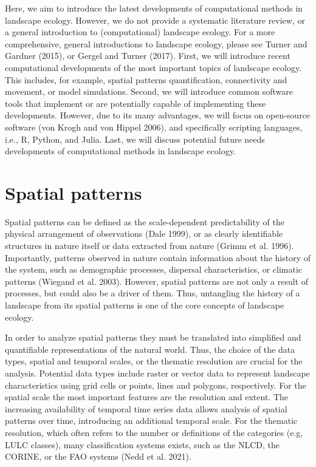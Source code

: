\documentclass[
  12pt,
  a4paperpaper,
]{article}
\begin{document}
Here, we aim to introduce the latest developments of computational
methods in landscape ecology. However, we do not provide a systematic
literature review, or a general introduction to (computational)
landscape ecology. For a more comprehensive, general introductions to
landscape ecology, please see Turner and Gardner (2015), or Gergel and
Turner (2017). First, we will introduce recent computational
developments of the most important topics of landscape ecology. This
includes, for example, spatial patterns quantification, connectivity and
movement, or model simulations. Second, we will introduce common
software tools that implement or are potentially capable of implementing
these developments. However, due to its many advantages, we will focus
on open-source software (von Krogh and von Hippel 2006), and
specifically scripting languages, i.e., R, Python, and Julia. Last, we
will discuss potential future needs developments of computational
methods in landscape ecology.

\section{Spatial patterns}\label{spatial-patterns}

Spatial patterns can be defined as the scale-dependent predictability of
the physical arrangement of observations (Dale 1999), or as clearly
identifiable structures in nature itself or data extracted from nature
(Grimm et al. 1996). Importantly, patterns observed in nature contain
information about the history of the system, such as demographic
processes, dispersal characteristics, or climatic patterns (Wiegand et
al. 2003). However, spatial patterns are not only a result of processes,
but could also be a driver of them. Thus, untangling the history of a
landscape from its spatial patterns is one of the core concepts of
landscape ecology.

In order to analyze spatial patterns they must be translated into
simplified and quantifiable representations of the natural world. Thus,
the choice of the data types, spatial and temporal scales, or the
thematic resolution are crucial for the analysis. Potential data types
include raster or vector data to represent landscape characteristics
using grid cells or points, lines and polygons, respectively. For the
spatial scale the most important features are the resolution and extent.
The increasing availability of temporal time series data allows analysis
of spatial patterns over time, introducing an additional temporal scale.
For the thematic resolution, which often refers to the number or
definitions of the categories (e.g, LULC classes), many classification
systems exists, such as the NLCD, the CORINE, or the FAO systems (Nedd
et al. 2021).
\end{document}
